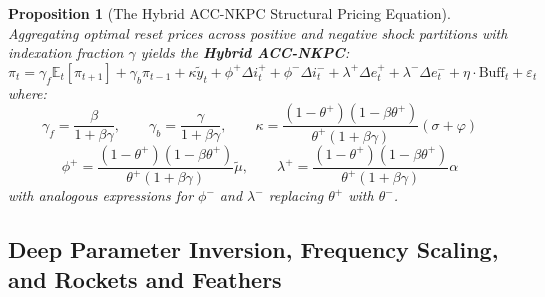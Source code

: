 \documentclass[review,12pt]{elsarticle}
\newtheorem{proposition}{Proposition}
\begin{document}
\begin{proposition}[The Hybrid ACC-NKPC Structural Pricing Equation]
Aggregating optimal reset prices across positive and negative shock partitions with indexation fraction $\gamma$ yields the \textbf{Hybrid ACC-NKPC}:
\begin{equation}
\boxed{\pi_t = \gamma_f \mathbb{E}_t[\pi_{t+1}] + \gamma_b \pi_{t-1} + \kappa \tilde{y}_t
+ \phi^{+} \Delta i_t^{+} + \phi^{-} \Delta i_t^{-}
+ \lambda^{+} \Delta e_t^{+} + \lambda^{-} \Delta e_t^{-}
+ \eta \cdot \text{Buff}_t + \varepsilon_t}
\label{eq:acc_nkpc}
\end{equation}
where:
\begin{equation}
\gamma_f = \frac{\beta}{1 + \beta\gamma}, \qquad \gamma_b = \frac{\gamma}{1 + \beta\gamma},
\qquad \kappa = \frac{(1-\theta^+)(1-\beta\theta^+)}{\theta^+(1+\beta\gamma)}(\sigma+\varphi)
\end{equation}
\begin{equation}
\phi^{+} = \frac{(1-\theta^+)(1-\beta\theta^+)}{\theta^+(1+\beta\gamma)}\tilde{\mu}, \qquad
\lambda^{+} = \frac{(1-\theta^+)(1-\beta\theta^+)}{\theta^+(1+\beta\gamma)}\alpha
\label{eq:slopes}
\end{equation}
with analogous expressions for $\phi^{-}$ and $\lambda^{-}$ replacing $\theta^{+}$ with $\theta^{-}$.
\end{proposition}

\subsection{Deep Parameter Inversion, Frequency Scaling, and Rockets and Feathers}
\end{document}
